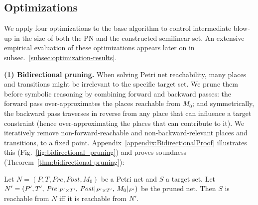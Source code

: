 %


\subsection{Optimizations}
\label{sec:optimizations}


We apply four optimizations to the base algorithm to control intermediate blow‐up in the size of both the PN and the constructed semilinear set. 
%
An extensive empirical evaluation of these optimizations appears later on in subsec.~\ref{subsec:optimization-results}.

\medskip
\noindent
\textbf{(1) Bidirectional pruning.}  
When solving Petri net reachability, many places and transitions might be irrelevant to the specific target set.  
	We prune them before symbolic reasoning by combining forward and backward passes:  
	the forward pass over-approximates the places reachable from $M_0$; and symmetrically,   
	the backward pass traverses in reverse from any place that can influence a target constraint (hence over-approximating the places that can contribute to it).
	We iteratively remove non-forward-reachable and
	non-backward-relevant places and transitions, to a fixed point.  
	Appendix~\ref{appendix:BidirectionalProof} illustrates this (Fig.~\ref{fig:bidirectional_pruning}) and proves soundness (Theorem~\ref{thm:bidirectional-pruning}):



\begin{theorem}
	\label{thm:bidirectional-pruning}
	Let $N = (P, T, Pre, Post, M_0)$ be a Petri net and $S$ a target set.  
	Let $N' = (P',T',\,\mathit{Pre}|_{P'\times T'},\,\mathit{Post}|_{P'\times T'},\,M_0|_{P'})$ be the pruned net.  
	Then $S$ is reachable from $N$ iff it is reachable from $N'$.
\end{theorem}
%
%

